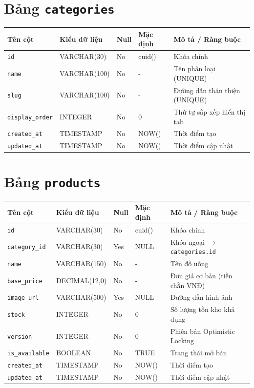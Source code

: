 \documentclass[12pt,a4paper,oneside]{report}
\begin{document}
\section{Bảng \texttt{categories}}
\begin{table}[H]
\centering
\small
\begin{tabularx}{\textwidth}{llllX}
\toprule
\textbf{Tên cột} & \textbf{Kiểu dữ liệu} & \textbf{Null} & \textbf{Mặc định} & \textbf{Mô tả / Ràng buộc} \\
\midrule
\texttt{id} & VARCHAR(30) & No & cuid() & Khóa chính \\
\texttt{name} & VARCHAR(100) & No & - & Tên phân loại (UNIQUE) \\
\texttt{slug} & VARCHAR(100) & No & - & Đường dẫn thân thiện (UNIQUE) \\
\texttt{display\_order} & INTEGER & No & 0 & Thứ tự sắp xếp hiển thị tab \\
\texttt{created\_at} & TIMESTAMP & No & NOW() & Thời điểm tạo \\
\texttt{updated\_at} & TIMESTAMP & No & NOW() & Thời điểm cập nhật \\
\bottomrule
\end{tabularx}
\end{table}

\section{Bảng \texttt{products}}
\begin{table}[H]
\centering
\small
\begin{tabularx}{\textwidth}{llllX}
\toprule
\textbf{Tên cột} & \textbf{Kiểu dữ liệu} & \textbf{Null} & \textbf{Mặc định} & \textbf{Mô tả / Ràng buộc} \\
\midrule
\texttt{id} & VARCHAR(30) & No & cuid() & Khóa chính \\
\texttt{category\_id} & VARCHAR(30) & Yes & NULL & Khóa ngoại \(\to\) \texttt{categories.id} \\
\texttt{name} & VARCHAR(150) & No & - & Tên đồ uống \\
\texttt{base\_price} & DECIMAL(12,0) & No & - & Đơn giá cơ bản (tiền chẵn VNĐ) \\
\texttt{image\_url} & VARCHAR(500) & Yes & NULL & Đường dẫn hình ảnh \\
\texttt{stock} & INTEGER & No & 0 & Số lượng tồn kho khả dụng \\
\texttt{version} & INTEGER & No & 0 & Phiên bản Optimistic Locking \\
\texttt{is\_available} & BOOLEAN & No & TRUE & Trạng thái mở bán \\
\texttt{created\_at} & TIMESTAMP & No & NOW() & Thời điểm tạo \\
\texttt{updated\_at} & TIMESTAMP & No & NOW() & Thời điểm cập nhật \\
\bottomrule
\end{tabularx}
\end{table}
\end{document}
